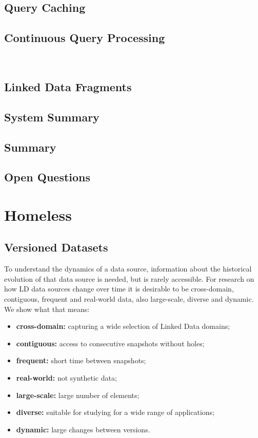 \documentclass[sw]{iosart2x}
\begin{document}
\subsection{Query Caching}\label{Caching}


\subsection{Continuous Query Processing}\label{Streams}

~\cite{DehghanzadehDGV15}

\subsection{Linked Data Fragments}\label{Fragments}
\subsection{System Summary}\label{System4}
\subsection{Summary}\label{Summary4}
\subsection{Open Questions}\label{Open4}


\section{Homeless}

\subsection{Versioned Datasets}\label{Datasets}

To understand the dynamics of a data source, information about the historical evolution of that data source is needed, but is rarely accessible. For research on how LD data sources change over time it is desirable to be cross-domain, contiguous, frequent and real-world data, also large-scale, diverse and dynamic. We show what that means:

\begin{itemize}
	
\item \textbf{cross-domain:} capturing a wide selection of Linked Data domains;
\item \textbf{contiguous:} access to consecutive snapshots without holes;
\item \textbf{frequent:} short time between snapshots;
\item \textbf{real-world:} not synthetic data; 
\item \textbf{large-scale:} large number of elements;
\item \textbf{diverse:} suitable for studying for a wide range of applications;
\item \textbf{dynamic:} large changes between versions.

\end{itemize}
\end{document}
